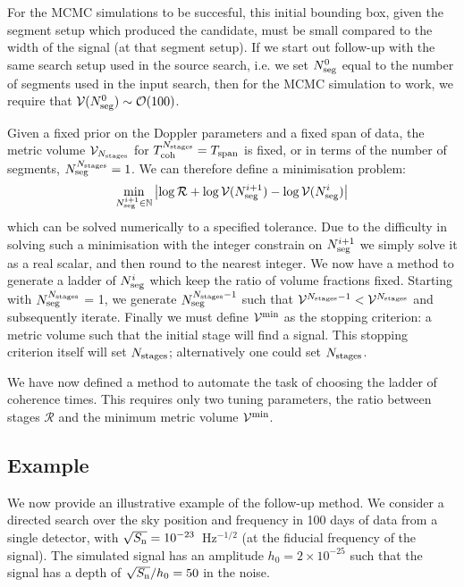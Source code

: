 \documentclass[aps, prd, twocolumn, superscriptaddress, floatfix, showpacs, nofootinbib, longbibliography]{revtex4-1}
\begin{document}
For the MCMC simulations to be succesful, this initial bounding
box, given the segment setup which produced the candidate, must be small
compared to the width of the signal (at that segment setup). If we start out
follow-up with the same search setup used in the source search, i.e.  we set
$N_{\rm seg}^0$ equal to the number of segments used in the input search, then for
the MCMC simulation to work, we require that $\mathcal{V}(N_{\rm seg}^{0}) \sim \mathcal{O}(100)$.

Given a fixed prior on the Doppler parameters and a fixed span of data, the
metric volume $\mathcal{V}_{N_{\rm stages}}$ for $T_{\rm coh}^{N_{\rm stages}} = T_{\rm span}$ is fixed, or in
terms of the number of segments, $N_{\rm seg}^{N_{\rm stages}} = 1$.
We can therefore define a minimisation problem:
\begin{align}
\min_{N_{\rm seg}^{i+1} \in \mathbb{N}}
\left| \log\mathcal{R} + \log\mathcal{V}(N_{\rm seg}^{i+1}) - \log\mathcal{V}(N_{\rm seg}^i)\right|
\end{align}
which can be solved numerically to a specified tolerance. Due to the difficulty
in solving such a minimisation with the integer constrain on $N_{\rm seg}^{i+1}$ we
simply solve it as a real scalar, and then round to the nearest integer. We now
have a method to generate a ladder of $N_{\rm seg}^{i}$ which keep the ratio of
volume fractions fixed. Starting with $N_{\rm seg}^{N_{\rm stages}}$ = 1, we generate
$N_{\rm seg}^{N_{\rm stages}-1}$ such that $\mathcal{V}^{N_{\rm stages}-1} < \mathcal{V}^{N_{\rm stages}}$ and
subsequently iterate.  Finally we must define $\mathcal{V}^{\rm min}$ as the stopping
criterion: a metric volume such that the initial stage will find a signal. This
stopping criterion itself will set $N_{\rm stages}$; alternatively one could set
$N_{\rm stages}$.

We have now defined a method to automate the task of choosing the ladder of
coherence times. This requires only two tuning parameters, the ratio between
stages $\mathcal{R}$ and the minimum metric volume $\mathcal{V}^{\min}$.

\subsection{Example}

We now provide an illustrative example of the follow-up method. We consider a
directed search over the sky position and frequency in 100 days of data from a
single detector, with $\sqrt{S_{\rm n}}=10^{-23}$~Hz$^{-1/2}$ (at the fiducial
frequency of the signal). The simulated signal has an amplitude
$h_0=2\times10^{-25}$ such that the signal has a depth of $\sqrt{S_{\rm n}}/h_0=50$
in the noise.
\end{document}
